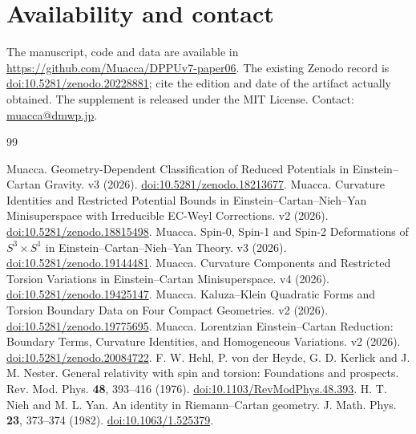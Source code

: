 \documentclass[11pt,a4paper]{article}
\begin{document}
\section*{Availability and contact}
The manuscript, code and data are available in \url{https://github.com/Muacca/DPPUv7-paper06}. The existing Zenodo record is \href{https://doi.org/10.5281/zenodo.20228881}{doi:10.5281/zenodo.20228881}; cite the edition and date of the artifact actually obtained. The supplement is released under the MIT License. Contact: \href{mailto:muacca@dmwp.jp}{muacca@dmwp.jp}.
\appendix






\begin{thebibliography}{99}
\footnotesize\raggedright
\setlength{\itemsep}{1pt}\setlength{\parsep}{0pt}
 Muacca. Geometry-Dependent Classification of Reduced Potentials in Einstein--Cartan Gravity. v3 (2026). \href{https://doi.org/10.5281/zenodo.18213677}{doi:10.5281/zenodo.18213677}.
 Muacca. Curvature Identities and Restricted Potential Bounds in Einstein--Cartan--Nieh--Yan Minisuperspace with Irreducible EC-Weyl Corrections. v2 (2026). \href{https://doi.org/10.5281/zenodo.18815498}{doi:10.5281/zenodo.18815498}.
 Muacca. Spin-0, Spin-1 and Spin-2 Deformations of $S^3\times S^1$ in Einstein--Cartan--Nieh--Yan Theory. v3 (2026). \href{https://doi.org/10.5281/zenodo.19144481}{doi:10.5281/zenodo.19144481}.
 Muacca. Curvature Components and Restricted Torsion Variations in Einstein--Cartan Minisuperspace. v4 (2026). \href{https://doi.org/10.5281/zenodo.19425147}{doi:10.5281/zenodo.19425147}.
 Muacca. Kaluza--Klein Quadratic Forms and Torsion Boundary Data on Four Compact Geometries. v2 (2026). \href{https://doi.org/10.5281/zenodo.19775695}{doi:10.5281/zenodo.19775695}.
 Muacca. Lorentzian Einstein--Cartan Reduction: Boundary Terms, Curvature Identities, and Homogeneous Variations. v2 (2026). \href{https://doi.org/10.5281/zenodo.20084722}{doi:10.5281/zenodo.20084722}.
 F. W. Hehl, P. von der Heyde, G. D. Kerlick and J. M. Nester. General relativity with spin and torsion: Foundations and prospects. Rev. Mod. Phys. \textbf{48}, 393--416 (1976). \href{https://doi.org/10.1103/RevModPhys.48.393}{doi:10.1103/RevModPhys.48.393}.
 H. T. Nieh and M. L. Yan. An identity in Riemann--Cartan geometry. J. Math. Phys. \textbf{23}, 373--374 (1982). \href{https://doi.org/10.1063/1.525379}{doi:10.1063/1.525379}.

\end{thebibliography}
\end{document}
